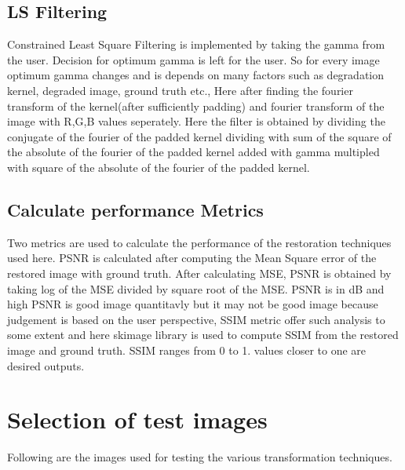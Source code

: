 \documentclass{article}
\begin{document}
\subsection{LS Filtering}
Constrained Least Square Filtering is implemented by taking the gamma from the user. Decision for optimum gamma is left for the user. So for every image optimum gamma changes and is depends on many factors such as degradation kernel, degraded image, ground truth etc., Here after finding the fourier transform of the kernel(after sufficiently padding) and fourier transform of the image with R,G,B values seperately. Here the filter is obtained by dividing the conjugate of the fourier of the padded kernel dividing with sum of the square of the absolute of the fourier of the padded kernel added with gamma multipled with square of the absolute of the fourier of the padded kernel.

\subsection{Calculate performance Metrics}
Two metrics are used to calculate the performance of the restoration techniques used here. PSNR is calculated after computing the Mean Square error of the restored image with ground truth. After calculating MSE, PSNR is obtained by taking log of the MSE divided by square root of the MSE. PSNR is in dB and high PSNR is good image quantitavly but it may not be good image because judgement is based on the user perspective, SSIM metric offer such analysis to some extent and here skimage library is used to compute SSIM from the restored image and ground truth. SSIM ranges from 0 to 1. values closer to one are desired outputs.

\section{Selection of test images}
\label{sec:typestyle}

Following are the images used for testing the various transformation techniques.
\end{document}
